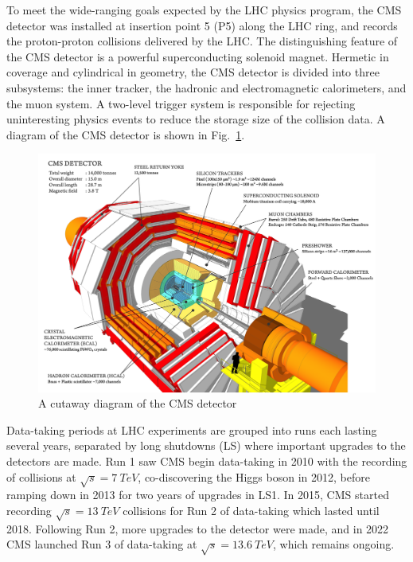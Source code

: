 

To meet the wide-ranging goals expected by the LHC physics program, the CMS detector \cite{CMSTDR} was installed at insertion point 5 (P5) along the LHC ring, and records the proton-proton collisions delivered by the LHC. The distinguishing feature of the CMS detector is a powerful superconducting solenoid magnet. Hermetic in coverage and cylindrical in geometry, the CMS detector is divided into three subsystems: the inner tracker, the hadronic and electromagnetic calorimeters, and the muon system. A two-level trigger system is responsible for rejecting uninteresting physics events to reduce the storage size of the collision data. A diagram of the CMS detector is shown in Fig.~\ref{fig:CMSDiagram}.

\begin{figure}[H]
    \centering
    \includegraphics[width=1\textwidth]{Images/CMS/CMSDiagram.png}
    \caption{A cutaway diagram of the CMS detector}
    \label{fig:CMSDiagram}
\end{figure}

Data-taking periods at LHC experiments are grouped into runs each lasting several years, separated by long shutdowns (LS) where important upgrades to the detectors are made. Run 1 saw CMS begin data-taking in 2010 with the recording of collisions at $\sqrt{s}=\SI{7}{TeV}$, co-discovering the Higgs boson in 2012, before ramping down in 2013 for two years of upgrades in LS1. In 2015, CMS started recording $\sqrt{s}=\SI{13}{TeV}$ collisions for Run 2 of data-taking which lasted until 2018. Following Run 2, more upgrades to the detector were made, and in 2022 CMS launched Run 3 of data-taking at $\sqrt{s}=\SI{13.6}{TeV}$, which remains ongoing.


